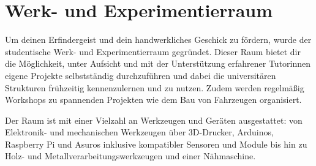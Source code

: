 
\section{Werk- und Experimentierraum}
\label{werk-und-experimentierraum}

Um deinen Erfindergeist und dein handwerkliches Geschick zu fördern, wurde der studentische Werk- und Experimentierraum gegründet. Dieser Raum bietet dir die Möglichkeit, unter Aufsicht und mit der Unterstützung erfahrener Tutorinnen eigene Projekte selbstständig durchzuführen und dabei die universitären Strukturen frühzeitig kennenzulernen und zu nutzen. Zudem werden regelmäßig Workshops zu spannenden Projekten wie dem Bau von Fahrzeugen organisiert.

Der Raum ist mit einer Vielzahl an Werkzeugen und Geräten ausgestattet: von Elektronik- und mechanischen Werkzeugen über 3D-Drucker, Arduinos, Raspberry Pi und Asuros inklusive kompatibler Sensoren und Module bis hin zu Holz- und Metallverarbeitungswerkzeugen und einer Nähmaschine.

